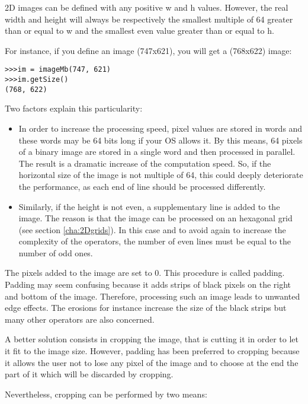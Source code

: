 \documentclass[a4paper,10pt,oneside]{article}
\begin{document}
2D images can be defined with any positive w and h values. However, the real width and height will
always be respectively the smallest multiple of 64 greater than or equal to w and the smallest even
value greater than or equal to h. 

For instance, if you define an image (747x621), you will get a (768x622) image:

\lstset{language=Python}
\begin{lstlisting}
>>>im = imageMb(747, 621)
>>>im.getSize()
(768, 622) 
\end{lstlisting}

Two factors explain this particularity:

\begin{itemize}
\item In order to increase the processing speed, pixel values are stored in words and these
words may be 64 bits long if your OS allows it. By this means, 64 pixels of a binary image
are stored in a single word and then processed in parallel. The result is a dramatic increase
of the computation speed. So, if the horizontal size of the image is not multiple of 64, this could
deeply deteriorate the performance, as each end of line should be processed differently. 
\item Similarly, if the height is not even, a supplementary line is added to the image. The
reason is that the image can be processed on an hexagonal grid (see section \ref{cha:2Dgrids}). In this case and to
avoid again to increase the complexity of the operators, the number of even lines must be equal to
the number of odd ones.
\end{itemize}

The pixels added to the image are set to 0. This procedure is called padding. Padding may seem confusing
because it adds strips of black pixels on the right and bottom of the image. Therefore, processing such an
image leads to unwanted edge effects. The erosions for instance increase the size of the black strips
but many other operators are also concerned.

A better solution consists in cropping the image, that is cutting it in order to let it fit to the image size.
However, padding has been preferred to cropping because it allows the user not to lose any pixel of the image
and to choose at the end the part of it which will be discarded by cropping.

Nevertheless, cropping can be performed by two means:
\end{document}
